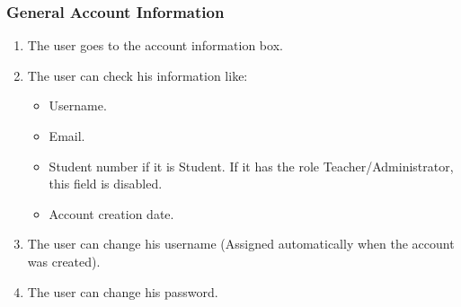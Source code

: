 \subsubsection{General Account Information}

\begin{enumerate}
    \item The user goes to the account information box.
    \item The user can check his information like:
    \begin{itemize}
        \item Username.
        \item Email.
        \item Student number if it is Student. If it has the role Teacher/Administrator, this field is disabled.
        \item Account creation date.
    \end{itemize}
    \item The user can change his username (Assigned automatically when the account was created).
    \item The user can change his password.
\end{enumerate}